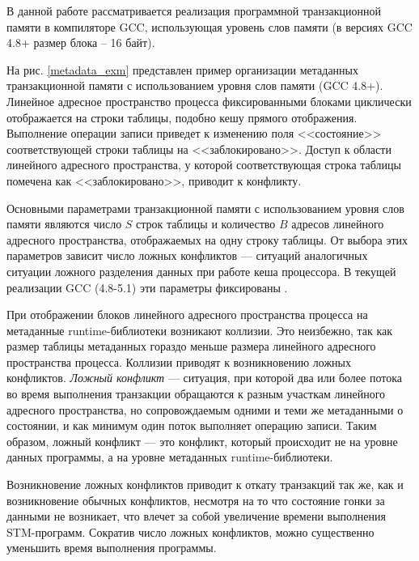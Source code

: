 В данной работе рассматривается реализация программной транзакционной памяти в 
компиляторе GCC, использующая уровень слов памяти (в версиях GCC 4.8+ размер 
блока – 16 байт).

На рис. \ref{metadata_exm} представлен пример организации метаданных 
транзакционной памяти с использованием уровня слов памяти (GCC 4.8+). Линейное 
адресное пространство процесса фиксированными блоками циклически отображается на 
строки таблицы, подобно кешу прямого отображения. Выполнение операции записи 
приведет к изменению поля <<состояние>> соответствующей строки таблицы на 
<<заблокировано>>. Доступ к области линейного адресного пространства, у которой 
соответствующая строка таблицы помечена как <<заблокировано>>, приводит к 
конфликту. 


Основными параметрами транзакционной памяти с использованием уровня слов памяти 
являются число $S$ строк таблицы и количество $B$ адресов линейного адресного 
пространства, отображаемых на одну строку таблицы. От выбора этих параметров 
зависит число ложных конфликтов --- ситуаций аналогичных ситуации ложного 
разделения данных при работе кеша процессора. В текущей реализации GCC (4.8-5.1) 
эти параметры фиксированы 
\cite{felber_fetzen_riegel_dynamic_performance_tuning}. 

При отображении блоков линейного адресного пространства процесса на метаданные 
runtime-библиотеки возникают коллизии. Это неизбежно, так как размер таблицы 
метаданных гораздо меньше размера линейного адресного пространства процесса. 
Коллизии приводят к возникновению ложных конфликтов. \textit{Ложный конфликт} 
--- ситуация, при которой два или более потока во время выполнения транзакции 
обращаются к разным участкам линейного адресного пространства, но сопровождаемым 
одними и теми же метаданными о состоянии, и как минимум один поток выполняет 
операцию записи. Таким образом, ложный конфликт --- это конфликт, который 
происходит не на уровне данных программы, а на уровне метаданных 
runtime-библиотеки.

Возникновение ложных конфликтов приводит к откату транзакций так же, как и 
возникновение обычных конфликтов, несмотря на то что состояние гонки за данными 
не возникает, что влечет за собой увеличение времени выполнения STM-программ. 
Сократив число ложных конфликтов, можно существенно уменьшить время выполнения 
программы.

